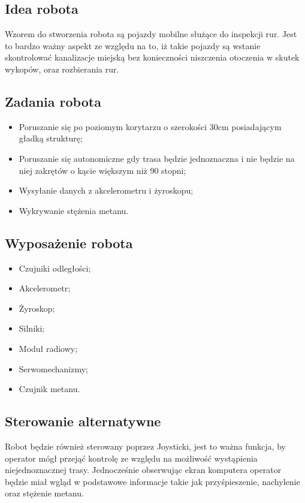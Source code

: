 \subsection{Idea robota}
Wzorem do stworzenia robota są pojazdy mobilne służące do inspekcji rur. Jest to bardzo ważny aspekt ze względu na to, iż takie pojazdy są wstanie skontrolować kanalizacje miejską bez konieczności niszczenia otoczenia w skutek wykopów, oraz rozbierania rur.
\subsection {Zadania robota}
\begin{itemize}
\item Poruszanie się po poziomym korytarzu o szerokości 30cm posiadającym gładką strukturę;
\item Poruszanie się autonomiczne gdy trasa będzie jednoznaczna i nie będzie na niej zakrętów o kącie większym niż 90 stopni;
\item Wysyłanie danych z akcelerometru i żyroskopu;
\item Wykrywanie stężenia metanu.
\end{itemize}

\subsection {Wyposażenie robota}
\begin{itemize}
\item Czujniki odległości;
\item Akcelerometr;
\item Żyroskop;
\item Silniki;
\item Moduł radiowy;
\item Serwomechanizmy;
\item Czujnik metanu.
\end{itemize}

\subsection{Sterowanie alternatywne}

Robot będzie również sterowany poprzez Joysticki, jest to ważna funkcja, by operator mógł przejąć kontrolę ze względu na możliwość wystąpienia niejednoznacznej trasy. Jednocześnie obserwując ekran komputera operator będzie miał wgląd w podstawowe informacje takie jak przyśpieszenie, nachylenie oraz stężenie metanu.